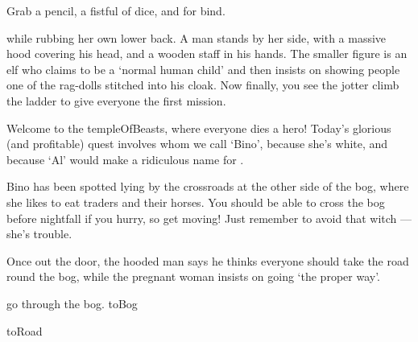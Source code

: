 \documentclass[10pt,twoside]{book}
\begin{document}

\pagebreak

\noindent
Grab a pencil, a fistful of dice, and  for \gls{bind}.

\pagebreak
\pagestyle{minizine}

while rubbing her own lower back.
A man stands by her side, with a massive hood covering his head, and a wooden staff in his hands.
The smaller figure is an elf who claims to be a `normal human child' and then insists on showing people one of the rag-dolls stitched into his cloak.
Now finally, you see the \gls{jotter} climb the ladder to give everyone the first mission.

\begin{speechtext}
  Welcome to the \gls{templeOfBeasts}, where everyone dies a hero!
  Today's glorious (and profitable) quest involves  whom we call `Bino', because she's white, and because `Al' would make a ridiculous name for .

  Bino has been spotted lying by the crossroads at the other side of the bog, where she likes to eat traders and their horses.
  You should be able to cross the bog before nightfall if you hurry, so get moving!
  Just remember to avoid that \gls{witch} --- she's trouble.
\end{speechtext}

Once out the door, the hooded man says he thinks everyone should take the road round the bog, while the pregnant woman insists on going `the proper way'.

\begin{selectPath}
  {go through the bog.}%
  {toBog}

  {}%
  {toRoad}
\end{selectPath}
\end{document}
